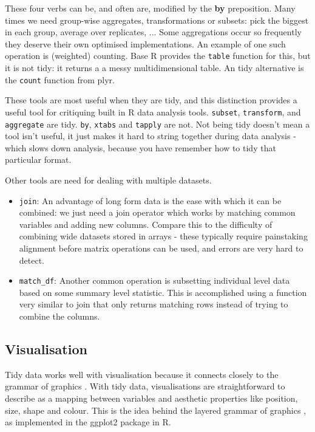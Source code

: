 \documentclass[oneside]{article}
\begin{document}
These four verbs can be, and often are, modified by the \textbf{by} preposition. Many times we need group-wise aggregates, transformations or subsets: pick the biggest in each group, average over replicates, ... Some aggregations occur so frequently they deserve their own optimised implementations. An example of one such operation is (weighted) counting. Base R provides the {\tt table} function for this, but it is not tidy: it returns a a messy multidimensional table. An tidy alternative is the {\tt count} function from plyr.

These tools are most useful when they are tidy, and this distinction provides a useful tool for critiquing built in R data analysis tools. {\tt subset}, {\tt transform}, and {\tt aggregate} are tidy. {\tt by}, {\tt xtabs} and {\tt tapply} are not. Not being tidy doesn't mean a tool isn't useful, it just makes it hard to string together during data analysis - which slows down analysis, because you have remember how to tidy that particular format.

Other tools are need for dealing with multiple datasets.  

\begin{itemize}

\item {\tt join}: An advantage of long form data is the ease with which it can be combined: we just need a join operator which works by matching common variables and adding new columns. Compare this to the difficulty of combining wide datasets stored in arrays - these typically require painstaking alignment before matrix operations can be used, and errors are very hard to detect. 

\item {\tt match\_df}: Another common operation is subsetting individual level data based on some summary level statistic. This is accomplished using a function very similar to join that only returns matching rows instead of trying to combine the columns.

\end{itemize}


\subsection{Visualisation}

Tidy data works well with visualisation because it connects closely to the grammar of graphics \citep{wilkinson:2006}. With tidy data, visualisations are straightforward to describe as a mapping between variables and aesthetic properties like position, size, shape and colour. This is the idea behind the layered grammar of graphics \citep{wickham:2007d}, as implemented in the ggplot2 package in R.
\end{document}

